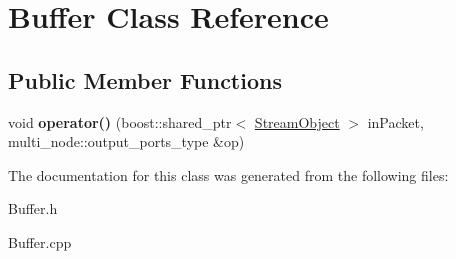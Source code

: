 \hypertarget{class_buffer}{}\section{Buffer Class Reference}
\label{class_buffer}
\subsection*{Public Member Functions}
\begin{DoxyCompactItemize}
\item 
void {\bfseries operator()} (boost\+::shared\+\_\+ptr$<$ \hyperlink{class_stream_object}{Stream\+Object} $>$ in\+Packet, multi\+\_\+node\+::output\+\_\+ports\+\_\+type \&op)\hypertarget{class_buffer_af7c9c153ae54fc8b37eff3b55a1cc272}{}\label{class_buffer_af7c9c153ae54fc8b37eff3b55a1cc272}

\end{DoxyCompactItemize}


The documentation for this class was generated from the following files\+:\begin{DoxyCompactItemize}
\item 
Buffer.\+h\item 
Buffer.\+cpp\end{DoxyCompactItemize}
